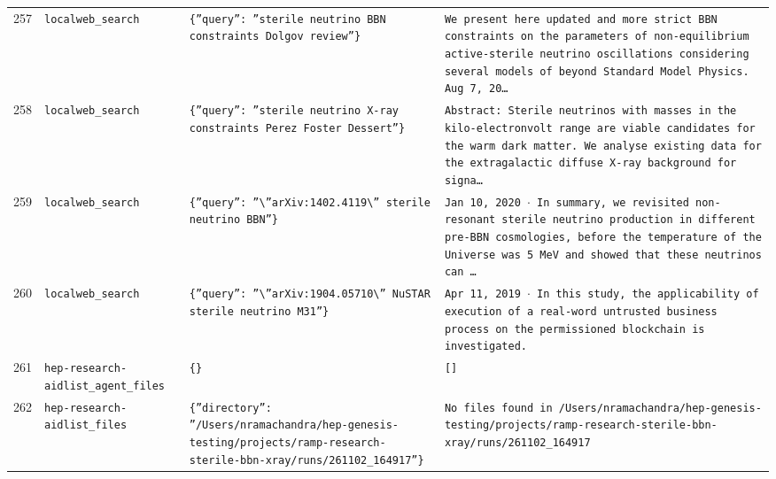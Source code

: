 \documentclass[11pt,a4paper]{article}
\begin{document}
\begin{longtable}{@{}p{}p{}p{}p{}@{}}
257 & \texttt{local}\newline\texttt{web\_\allowbreak{}search} & \texttt{\{''query'':\allowbreak{} ''sterile neutrino BBN constraints Dolgov review''\}\allowbreak{}} & \texttt{We present here updated and more strict BBN constraints on the parameters of non-equilibrium active-sterile neutrino oscillations considering several models of beyond Standard Model Physics. Aug 7,\allowbreak{} 20\ldots{}\allowbreak{}} \\
258 & \texttt{local}\newline\texttt{web\_\allowbreak{}search} & \texttt{\{''query'':\allowbreak{} ''sterile neutrino X-ray constraints Perez Foster Dessert''\}\allowbreak{}} & \texttt{Abstract:\allowbreak{} Sterile neutrinos with masses in the kilo-electronvolt range are viable candidates for the warm dark matter. We analyse existing data for the extragalactic diffuse X-ray background for signa\ldots{}\allowbreak{}} \\
259 & \texttt{local}\newline\texttt{web\_\allowbreak{}search} & \texttt{\{''query'':\allowbreak{} ''\textbackslash{}\allowbreak{}''arXiv:\allowbreak{}1402.4119\textbackslash{}\allowbreak{}'' sterile neutrino BBN''\}\allowbreak{}} & \texttt{Jan 10,\allowbreak{} 2020 $\cdot$ In summary,\allowbreak{} we revisited non-resonant sterile neutrino production in different pre-BBN cosmologies,\allowbreak{} before the temperature of the Universe was 5 MeV and showed that these neutrinos can \ldots{}\allowbreak{}} \\
260 & \texttt{local}\newline\texttt{web\_\allowbreak{}search} & \texttt{\{''query'':\allowbreak{} ''\textbackslash{}\allowbreak{}''arXiv:\allowbreak{}1904.05710\textbackslash{}\allowbreak{}'' NuSTAR sterile neutrino M31''\}\allowbreak{}} & \texttt{Apr 11,\allowbreak{} 2019 $\cdot$ In this study,\allowbreak{} the applicability of execution of a real-word untrusted business process on the permissioned blockchain is investigated.} \\
261 & \texttt{hep-research-aid}\newline\texttt{list\_\allowbreak{}agent\_\allowbreak{}files} & \texttt{\{\}\allowbreak{}} & \texttt{[]\allowbreak{}} \\
262 & \texttt{hep-research-aid}\newline\texttt{list\_\allowbreak{}files} & \texttt{\{''directory'':\allowbreak{} ''/\allowbreak{}Users/\allowbreak{}nramachandra/\allowbreak{}hep-genesis-testing/\allowbreak{}projects/\allowbreak{}ramp-research-sterile-bbn-xray/\allowbreak{}runs/\allowbreak{}261102\_\allowbreak{}164917''\}\allowbreak{}} & \texttt{No files found in /\allowbreak{}Users/\allowbreak{}nramachandra/\allowbreak{}hep-genesis-testing/\allowbreak{}projects/\allowbreak{}ramp-research-sterile-bbn-xray/\allowbreak{}runs/\allowbreak{}261102\_\allowbreak{}164917} \\

\end{longtable}
\end{document}
